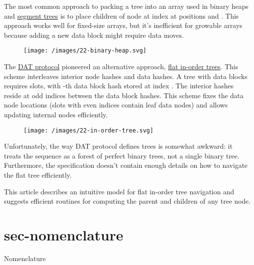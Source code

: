 \documentclass{article}
\begin{document}
The most common approach to packing a tree into an array used in binary heaps and \href{https://cp-algorithms.com/data_structures/segment_tree.html}{segment trees} is to place children of node at index  at positions  and .
This approach works well for fixed-size arrays, but it's inefficient for growable arrays because adding a new data block might require  data moves.

\begin{figure}[grayscale-diagram,medium-size]
  \texttt{[image: /images/22-binary-heap.svg]}
\end{figure}

The \href{https://www.datprotocol.com/}{DAT protocol} pioneered an alternative approach, \href{https://dat-ecosystem-archive.github.io/book/ch01-01-flat-tree.html}{flat in-order trees}.
This scheme interleaves interior node hashes and data hashes.
A tree with  data blocks requires  slots, with -th data block hash stored at index .
The interior hashes reside at odd indices between the data block hashes.
This scheme fixes the data node locations (slots with even indices contain leaf data nodes) and allows updating internal nodes efficiently.

\begin{figure}[grayscale-diagram,medium-size]
  \texttt{[image: /images/22-in-order-tree.svg]}
\end{figure}

Unfortunately, the way DAT protocol defines trees is somewhat awkward: it treats the sequence as a forest of perfect binary trees, not a single binary tree.
Furthermore, the specification doesn't contain enough details on how to navigate the flat tree efficiently.

This article describes an intuitive model for flat in-order tree navigation and suggests efficient routines for computing the parent and children of any tree node.

\section{sec-nomenclature}{Nomenclature}
\end{document}
